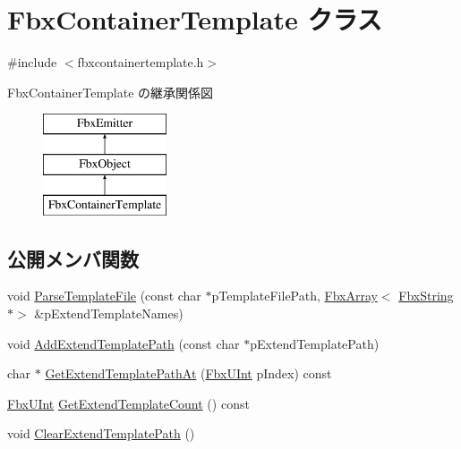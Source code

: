 \hypertarget{class_fbx_container_template}{}\section{Fbx\+Container\+Template クラス}
\label{class_fbx_container_template}


{\ttfamily \#include $<$fbxcontainertemplate.\+h$>$}

Fbx\+Container\+Template の継承関係図\begin{figure}[H]
\begin{center}
\leavevmode
\includegraphics[height=3.000000cm]{class_fbx_container_template}
\end{center}
\end{figure}
\subsection*{公開メンバ関数}
\begin{DoxyCompactItemize}
\item 
void \hyperlink{class_fbx_container_template_ae12881e9350b8eea3598874208f06e18}{Parse\+Template\+File} (const char $\ast$p\+Template\+File\+Path, \hyperlink{class_fbx_array}{Fbx\+Array}$<$ \hyperlink{class_fbx_string}{Fbx\+String} $\ast$$>$ \&p\+Extend\+Template\+Names)
\item 
void \hyperlink{class_fbx_container_template_aa3f0f367f7e95139f439169e340104df}{Add\+Extend\+Template\+Path} (const char $\ast$p\+Extend\+Template\+Path)
\item 
char $\ast$ \hyperlink{class_fbx_container_template_a09069044c9d47154b8981e592fd2b016}{Get\+Extend\+Template\+Path\+At} (\hyperlink{fbxtypes_8h_ae9fb141d8158a730aa85ec5ff2ea3f6b}{Fbx\+U\+Int} p\+Index) const
\item 
\hyperlink{fbxtypes_8h_ae9fb141d8158a730aa85ec5ff2ea3f6b}{Fbx\+U\+Int} \hyperlink{class_fbx_container_template_a552b2b289ce6ec39e031a0032234cac4}{Get\+Extend\+Template\+Count} () const
\item 
void \hyperlink{class_fbx_container_template_a6f2fbdd59ebc8966e980f5ed7e837d00}{Clear\+Extend\+Template\+Path} ()
\end{DoxyCompactItemize}

